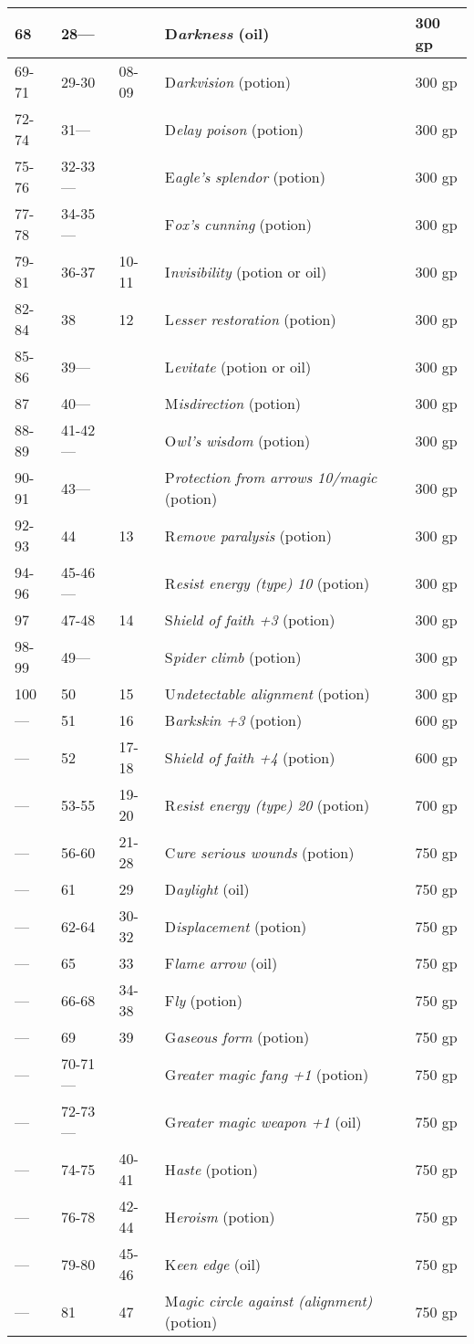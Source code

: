 \documentclass{article}
\begin{document}
\begin{tabular}{|>{\raggedright}p{27pt}|>{\raggedright}p{34pt}|>{\raggedright}p{26pt}|>{\raggedright}p{149pt}|>{\raggedright}p{52pt}|}
\hline
68 & 28--- &  & D\textit{arkness }(oil) & 300 gp\tabularnewline
\hline
69-71 & 29-30 & 08-09 & D\textit{arkvision }(potion) & 300 gp\tabularnewline
\hline
72-74 & 31--- &  & D\textit{elay poison }(potion) & 300 gp\tabularnewline
\hline
75-76 & 32-33--- &  & E\textit{agle's splendor }(potion) & 300 gp\tabularnewline
\hline
77-78 & 34-35--- &  & F\textit{ox's cunning }(potion) & 300 gp\tabularnewline
\hline
79-81 & 36-37 & 10-11 & I\textit{nvisibility }(potion or oil) & 300 gp\tabularnewline
\hline
82-84 & 38 & 12 & L\textit{esser restoration }(potion) & 300 gp\tabularnewline
\hline
85-86 & 39--- &  & L\textit{evitate }(potion or oil) & 300 gp\tabularnewline
\hline
87 & 40--- &  & M\textit{isdirection }(potion) & 300 gp\tabularnewline
\hline
88-89 & 41-42--- &  & O\textit{wl's wisdom }(potion) & 300 gp\tabularnewline
\hline
90-91 & 43--- &  & P\textit{rotection from arrows 10/magic }(potion) & 300 gp\tabularnewline
\hline
92-93 & 44 & 13 & R\textit{emove paralysis }(potion) & 300 gp\tabularnewline
\hline
94-96 & 45-46--- &  & R\textit{esist energy (type) 10 }(potion) & 300 gp\tabularnewline
\hline
97 & 47-48 & 14 & S\textit{hield of faith +3 }(potion) & 300 gp\tabularnewline
\hline
98-99 & 49--- &  & S\textit{pider climb }(potion) & 300 gp\tabularnewline
\hline
100 & 50 & 15 & U\textit{ndetectable alignment }(potion) & 300 gp\tabularnewline
\hline
--- & 51 & 16 & B\textit{arkskin +3 }(potion) & 600 gp\tabularnewline
\hline
--- & 52 & 17-18 & S\textit{hield of faith +4 }(potion) & 600 gp\tabularnewline
\hline
--- & 53-55 & 19-20 & R\textit{esist energy (type) 20 }(potion) & 700 gp\tabularnewline
\hline
--- & 56-60 & 21-28 & C\textit{ure serious wounds }(potion) & 750 gp\tabularnewline
\hline
--- & 61 & 29 & D\textit{aylight }(oil) & 750 gp\tabularnewline
\hline
--- & 62-64 & 30-32 & D\textit{isplacement }(potion) & 750 gp\tabularnewline
\hline
--- & 65 & 33 & F\textit{lame arrow }(oil) & 750 gp\tabularnewline
\hline
--- & 66-68 & 34-38 & F\textit{ly }(potion) & 750 gp\tabularnewline
\hline
--- & 69 & 39 & G\textit{aseous form }(potion) & 750 gp\tabularnewline
\hline
--- & 70-71--- &  & G\textit{reater magic fang +1 }(potion) & 750 gp\tabularnewline
\hline
--- & 72-73--- &  & G\textit{reater magic weapon +1 }(oil) & 750 gp\tabularnewline
\hline
--- & 74-75 & 40-41 & H\textit{aste }(potion) & 750 gp\tabularnewline
\hline
--- & 76-78 & 42-44 & H\textit{eroism }(potion) & 750 gp\tabularnewline
\hline
--- & 79-80 & 45-46 & K\textit{een edge }(oil) & 750 gp\tabularnewline
\hline
--- & 81 & 47 & M\textit{agic circle against (alignment) }(potion) & 750 gp\tabularnewline

\end{tabular}
\end{document}
